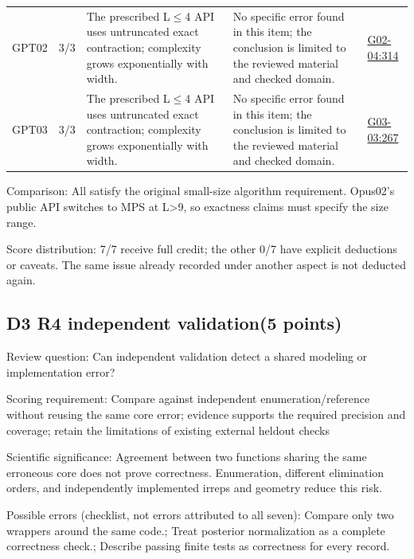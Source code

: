 \documentclass[11pt,a4paper]{article}
\begin{document}
{\begin{longtable}
{}GPT02 & 3/\allowbreak{}3 & The prescribed L\ensuremath{\leq}4 API uses untruncated exact contraction; complexity grows exponentially with width. & No specific error found in this item; the conclusion is limited to the reviewed material and checked domain. & \hyperref[src:G02-04]{G02-04:314}\tabularnewline
{}GPT03 & 3/\allowbreak{}3 & The prescribed L\ensuremath{\leq}4 API uses untruncated exact contraction; complexity grows exponentially with width. & No specific error found in this item; the conclusion is limited to the reviewed material and checked domain. & \hyperref[src:G03-03]{G03-03:267}\tabularnewline
\bottomrule
\end{longtable}
}
Comparison: All satisfy the original small-size algorithm requirement. Opus02's public API switches to MPS at L>9,\allowbreak{} so exactness claims must specify the size range.

Score distribution: 7/\allowbreak{}7 receive full credit; the other 0/\allowbreak{}7 have explicit deductions or caveats. The same issue already recorded under another aspect is not deducted again.

\clearpage
\subsection{D3 R4 independent validation(5 points)}
\label{aspect:D3}
Review question: Can independent validation detect a shared modeling or implementation error?

Scoring requirement: Compare against independent enumeration/\allowbreak{}reference without reusing the same core error; evidence supports the required precision and coverage; retain the limitations of existing external heldout checks

Scientific significance: Agreement between two functions sharing the same erroneous core does not prove correctness. Enumeration,\allowbreak{} different elimination orders,\allowbreak{} and independently implemented irreps and geometry reduce this risk.

Possible errors (checklist,\allowbreak{} not errors attributed to all seven): Compare only two wrappers around the same code.; Treat posterior normalization as a complete correctness check.; Describe passing finite tests as correctness for every record.
\end{document}
